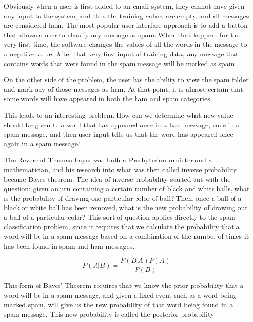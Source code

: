 \documentclass[12pt]{article}
\begin{document}
Obviously when a user is first added to an email system, they cannot have given any input to the system, and
thus the training values are empty, and all messages are considered ham. The most popular user interface
approach is to add a button that allows a user to classify any message as spam. When that happens for the very
first time, the software changes the values of all the words in the message to a negative value. After that
very first input of training data, any message that contains words that were found in the spam message will be
marked as spam.

On the other side of the problem, the user has the ability to view the spam folder and mark any of those
messages as ham. At that point, it is almost certain that some words will have appeared in both the ham and
spam categories.

This leads to an interesting problem. How can we determine what new value should be given to a word that has
appeared once in a ham message, once in a spam message, and then user input tells us that the word has
appeared once again in a spam message?

The Reverend Thomas Bayes was both a Presbyterian minister and a mathematician, and his research into what was
then called inverse probability became Bayes theorem. The idea of inverse probability started out with the
question: given an urn containing a certain number of black and white balls, what is the probability of
drawing one particular color of ball? Then, once a ball of a black or white ball has been removed, what is the
new probability of drawing out a ball of a particular color? This sort of question applies directly to the
spam classification problem, since it requires that we calculate the probability that a word will be in a spam
message based on a combination of the number of times it has been found in spam and ham messages.

$$P(A|B)= \dfrac{P(B|A)P(A)}{P(B)}$$

This form of Bayes' Theorem requires that we know the prior probability that a word will be in a spam
message, and given a fixed event such as a word being marked spam, will give us the new probability of that
word being found in a spam message. This new probability is called the posterior probability.
\end{document}
